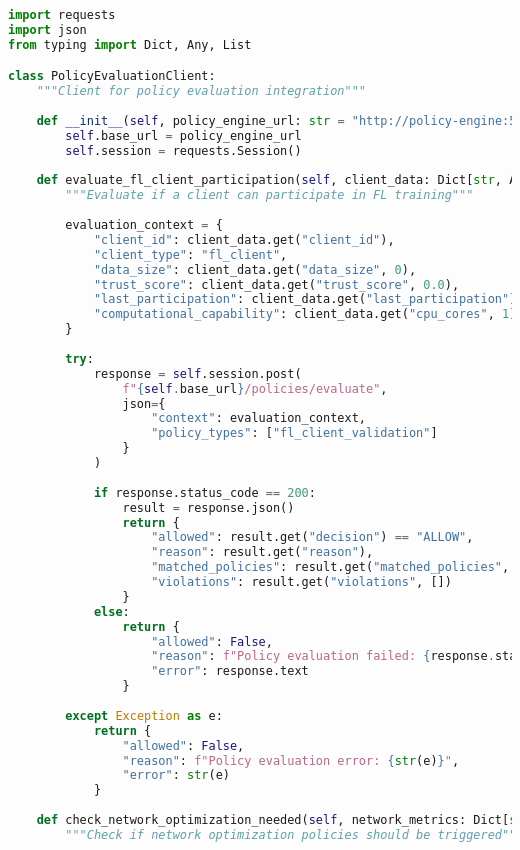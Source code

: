\begin{lstlisting}[language=python, caption=Policy Evaluation Client]
import requests
import json
from typing import Dict, Any, List

class PolicyEvaluationClient:
    """Client for policy evaluation integration"""
    
    def __init__(self, policy_engine_url: str = "http://policy-engine:5000"):
        self.base_url = policy_engine_url
        self.session = requests.Session()
    
    def evaluate_fl_client_participation(self, client_data: Dict[str, Any]) -> Dict[str, Any]:
        """Evaluate if a client can participate in FL training"""
        
        evaluation_context = {
            "client_id": client_data.get("client_id"),
            "client_type": "fl_client",
            "data_size": client_data.get("data_size", 0),
            "trust_score": client_data.get("trust_score", 0.0),
            "last_participation": client_data.get("last_participation"),
            "computational_capability": client_data.get("cpu_cores", 1)
        }
        
        try:
            response = self.session.post(
                f"{self.base_url}/policies/evaluate",
                json={
                    "context": evaluation_context,
                    "policy_types": ["fl_client_validation"]
                }
            )
            
            if response.status_code == 200:
                result = response.json()
                return {
                    "allowed": result.get("decision") == "ALLOW",
                    "reason": result.get("reason"),
                    "matched_policies": result.get("matched_policies", []),
                    "violations": result.get("violations", [])
                }
            else:
                return {
                    "allowed": False,
                    "reason": f"Policy evaluation failed: {response.status_code}",
                    "error": response.text
                }
        
        except Exception as e:
            return {
                "allowed": False,
                "reason": f"Policy evaluation error: {str(e)}",
                "error": str(e)
            }
    
    def check_network_optimization_needed(self, network_metrics: Dict[str, float]) -> bool:
        """Check if network optimization policies should be triggered"""
        

\end{lstlisting}
